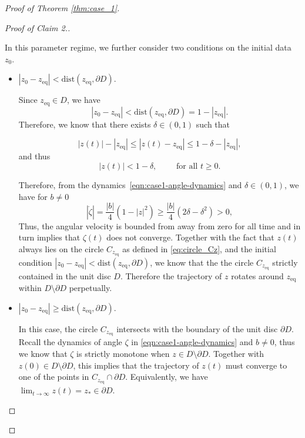 \documentclass[10pt]{article}
\theoremstyle{definition}
\theoremstyle{definition}
\numberwithin{equation}{section}
\newcommand{\zeq}{z_{\mathrm{eq}}}
\begin{document}
\begin{proof}[Proof of Theorem \ref{thm:case_1}]
\begin{proof}[Proof of Claim 2.]
\begin{itemize}
            In this parameter regime, we further consider two conditions on the initial data $z_0$.

            \begin{itemize}
                \item $|z_0 - z_{\mathrm{eq}}| < \mathrm{dist}(z_{\mathrm{eq}}, \partial D)$.

                Since $\zeq \in D$, we have
                \begin{equation*}
                    |z_0 - z_{\mathrm{eq}}| < \mathrm{dist}(z_{\mathrm{eq}}, \partial D) = 1 - |\zeq| .
                \end{equation*}
                Therefore, we know that there exists $\delta \in (0,1)$ such that

                \[
            |z(t)| - |z_\mathrm{eq}| \leq |z(t) - z_\mathrm{eq}| \leq 1 - \delta - |z_\mathrm{eq}|,
        \]
        and thus
        \[
            |z(t)| < 1 - \delta, \qquad \text{ for all } t \geq 0.
        \]

        Therefore, from the dynamics~\eqref{eqn:case1-angle-dynamics} and $\delta \in (0,1)$, we have for $b \neq 0$
        \[
            |\dot{\zeta}| = \frac{|b|}{4} (1 - |z|^2) \geq \frac{|b|}{4} (2 \delta - \delta^2) > 0,
        \]
        Thus, the angular velocity is bounded from away from zero for all time and in turn implies that $\zeta(t)$ does not converge.
        Together with the fact that $z(t)$ always lies on the circle $C_{\zeq}$ as defined in \eqref{eq:circle_Cz},
        and the initial condition $|z_0 - z_{\mathrm{eq}}| < \mathrm{dist}(z_{\mathrm{eq}}, \partial D)$,
        we know that the the circle $C_{\zeq}$ strictly contained in the unit disc $D$. 
        Therefore the trajectory of $z$ rotates around $z_{\mathrm{eq}}$ within $D \setminus \partial D$ perpetually. 

        \item $|z_0 - \zeq| \geq \mathrm{dist} (\zeq, \partial D)$.

        In this case, the circle $C_{\zeq}$ intersects with the boundary of the unit disc $\partial D$.
        Recall the dynamics of angle $\zeta$ in \eqref{eqn:case1-angle-dynamics}
        and $b \neq 0$,
        thus we know that $\zeta$ is strictly monotone when $z \in D \setminus \partial D$.
        Together with $z(0) \in D \setminus \partial D$,
        this implies that the trajectory of $z(t)$ must converge to one of the points in $C_{\zeq} \cap \partial D$.
        Equivalently, we have $\lim_{t \to \infty} z(t) = z_* \in \partial D$.
            

\end{itemize}
\end{itemize}
\end{proof}
\end{proof}
\end{document}
